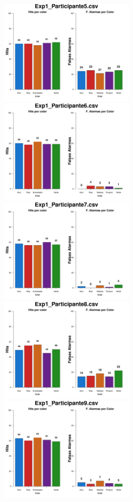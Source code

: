 \documentclass[a4paper ]{article}
\begin{document}
\begin{figure}[th]
\includegraphics[width=9cm, height=5cm]{Figures/Color_Exp1_P5} \includegraphics[width=9cm, height=5cm]{Figures/Color_Exp1_P6}
\includegraphics[width=9cm, height=5cm]{Figures/Color_Exp1_P7} \includegraphics[width=9cm, height=5cm]{Figures/Color_Exp1_P8} 
\includegraphics[width=9cm, height=5cm]{Figures/Color_Exp1_P9}
\end{figure}
\end{document}

